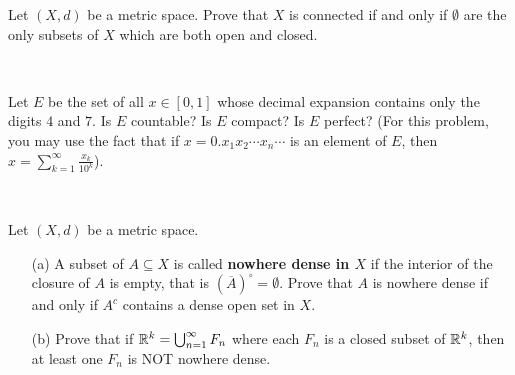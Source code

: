 \documentclass[a4paper]{article}
\begin{document}
\newpage
\begin{problem}
    Let \( (X,d) \) be a metric space. Prove that \( X  \) is connected if and only if \( \emptyset \) are the only subsets of \( X  \) which are both open and closed.
\end{problem}
\newpage 

\

\newpage
\begin{problem}
    Let \( E  \) be the set of all \( x \in [0,1] \) whose decimal expansion contains only the digits \( 4  \) and \( 7  \). Is \( E   \) countable? Is \( E  \) compact? Is \( E  \) perfect? (For this problem, you may use the fact that if \( x = 0.{x}_{1} {x}_{2} \cdots {x}_{n} \cdots \) is an element of \( E  \), then \( x = \sum_{ k=1  }^{ \infty   } \frac{ {x}_{k} }{  10^{k} }  \)).
\end{problem}
\newpage

\

\newpage


\begin{problem}
    Let \( (X,d) \) be a metric space.
        \begin{enumerate}
            \item[(a)] A subset of \( A \subseteq  X  \) is called \textbf{nowhere dense in \( X  \)} if the interior of the closure of \( A  \) is empty, that is \( (\overline{A})^{\circ} = \emptyset \). Prove that \( A  \) is nowhere dense if and only if \( A^{c} \) contains a dense open set in \( X  \).
            \item[(b)] Prove that if \( \mathbb{R}^{k} = \bigcup_{ n=1  }^{ \infty    } {F}_{n} \) where each \( {F}_{n} \) is a closed subset of \( \mathbb{R}^{k }  \), then at least one \( {F}_{n} \) is NOT nowhere dense.
        \end{enumerate}
\end{problem}

\newpage

\

\newpage
\end{document}
